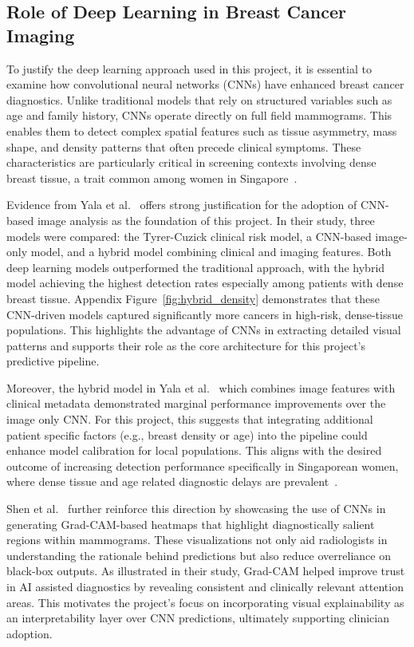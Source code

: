 \documentclass[12pt]{article}
\begin{document}
\subsection{Role of Deep Learning in Breast Cancer Imaging}

To justify the deep learning approach used in this project, it is essential to examine how convolutional neural networks (CNNs) have enhanced breast cancer diagnostics. Unlike traditional models that rely on structured variables such as age and family history, CNNs operate directly on full field mammograms. This enables them to detect complex spatial features such as tissue asymmetry, mass shape, and density patterns that often precede clinical symptoms. These characteristics are particularly critical in screening contexts involving dense breast tissue, a trait common among women in Singapore~\cite{6}.

Evidence from Yala et al.~\cite{1} offers strong justification for the adoption of CNN-based image analysis as the foundation of this project. In their study, three models were compared: the Tyrer-Cuzick clinical risk model, a CNN-based image-only model, and a hybrid model combining clinical and imaging features. Both deep learning models outperformed the traditional approach, with the hybrid model achieving the highest detection rates especially among patients with dense breast tissue. Appendix Figure~\ref{fig:hybrid_density} demonstrates that these CNN-driven models captured significantly more cancers in high-risk, dense-tissue populations. This highlights the advantage of CNNs in extracting detailed visual patterns and supports their role as the core architecture for this project’s predictive pipeline.

Moreover, the hybrid model in Yala et al.~\cite{1} which combines image features with clinical metadata demonstrated marginal performance improvements over the image only CNN. For this project, this suggests that integrating additional patient specific factors (e.g., breast density or age) into the pipeline could enhance model calibration for local populations. This aligns with the desired outcome of increasing detection performance specifically in Singaporean women, where dense tissue and age related diagnostic delays are prevalent~\cite{6,10}.

Shen et al.~\cite{7} further reinforce this direction by showcasing the use of CNNs in generating Grad-CAM-based heatmaps that highlight diagnostically salient regions within mammograms. These visualizations not only aid radiologists in understanding the rationale behind predictions but also reduce overreliance on black-box outputs. As illustrated in their study, Grad-CAM helped improve trust in AI assisted diagnostics by revealing consistent and clinically relevant attention areas. This motivates the project's focus on incorporating visual explainability as an interpretability layer over CNN predictions, ultimately supporting clinician adoption.
\end{document}
